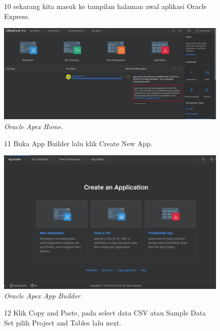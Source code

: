 \begin{enumerate}
\begin{figure}
\item[10] sekarang kita masuk ke tampilan halaman awal aplikasi Oracle Express.

    \begin{center}
\includegraphics[scale=0.3]{figures/halamanApex.png}
    \caption{\textit{Oracle Apex Home.}}
        \end{center}
\label{gambar}
\end{figure}

\begin{figure}
\item[11] Buka App Builder lalu klik Create New App.

    \begin{center}
\includegraphics[scale=0.4]{figures/createAppFromfile.png}
    \caption{\textit{Oracle Apex App Builder}}
        \end{center}
\label{gambar}
\end{figure}

\begin{figure}
\item[12] Klik Copy and Paste, pada select data CSV atau Sample Data Set pilih Project and Tables lalu next.


\end{figure}
\end{enumerate}
